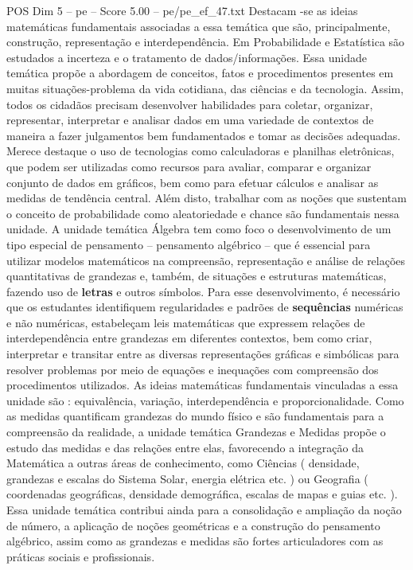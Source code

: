 \begin{textsample}{POS Dim 5 – pe – Score 5.00 – pe/pe\_ef\_47.txt}
Destacam -se as ideias matemáticas fundamentais associadas a essa temática que são, principalmente, construção, representação e interdependência.
Em Probabilidade e Estatística são estudados a incerteza e o tratamento de dados/informações.
Essa unidade temática propõe a abordagem de conceitos, fatos e procedimentos presentes em muitas situações-problema da vida cotidiana, das ciências e da tecnologia.
Assim, todos os cidadãos precisam desenvolver habilidades para coletar, organizar, representar, interpretar e analisar dados em uma variedade de contextos de maneira a fazer julgamentos bem fundamentados e tomar as decisões adequadas.
Merece destaque o uso de tecnologias como calculadoras e planilhas eletrônicas, que podem ser utilizadas como recursos para avaliar, comparar e organizar conjunto de dados em gráficos, bem como para efetuar cálculos e analisar as medidas de tendência central.
Além disto, trabalhar com as noções que sustentam o conceito de probabilidade como aleatoriedade e chance são fundamentais nessa unidade.
A unidade temática Álgebra tem como foco o desenvolvimento de um tipo especial de pensamento – pensamento algébrico – que é essencial para utilizar modelos matemáticos na compreensão, representação e análise de relações quantitativas de grandezas e, também, de situações e estruturas matemáticas, fazendo uso de \textbf{letras} e outros símbolos.
Para esse desenvolvimento, é necessário que os estudantes identifiquem regularidades e padrões de \textbf{sequências} numéricas e não numéricas, estabeleçam leis matemáticas que expressem relações de interdependência entre grandezas em diferentes contextos, bem como criar, interpretar e transitar entre as diversas representações gráficas e simbólicas para resolver problemas por meio de equações e inequações com compreensão dos procedimentos utilizados.
As ideias matemáticas fundamentais vinculadas a essa unidade são : equivalência, variação, interdependência e proporcionalidade.
Como as medidas quantificam grandezas do mundo físico e são fundamentais para a compreensão da realidade, a unidade temática Grandezas e Medidas propõe o estudo das medidas e das relações entre elas, favorecendo a integração da Matemática a outras áreas de conhecimento, como Ciências ( densidade, grandezas e escalas do Sistema Solar, energia elétrica etc. ) ou Geografia ( coordenadas geográficas, densidade demográfica, escalas de mapas e guias etc. ).
Essa unidade temática contribui ainda para a consolidação e ampliação da noção de número, a aplicação de noções geométricas e a construção do pensamento algébrico, assim como as grandezas e medidas são fortes articuladores com as práticas sociais e profissionais.

\end{textsample}
